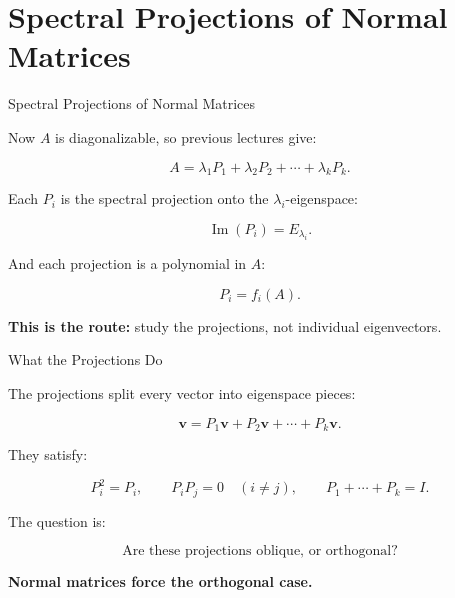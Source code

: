\documentclass[10pt]{beamer}
\theoremstyle{definition}
\newcommand{\x}[1]{\alert{\textbf{#1}}}
\begin{document}
\section{Spectral Projections of Normal Matrices}

\begin{frame}{Spectral Projections of Normal Matrices}

Now $A$ is diagonalizable, so previous lectures give:

$$
A=\lambda_1P_1+\lambda_2P_2+\cdots+\lambda_kP_k.
$$

\vfill

Each $P_i$ is the spectral projection onto the $\lambda_i$-eigenspace:

$$
\operatorname{Im}(P_i)=E_{\lambda_i}.
$$

\vfill\pause

And each projection is a polynomial in $A$:

$$
P_i=f_i(A).
$$

\vfill

\x{This is the route:} study the projections, not individual eigenvectors.

\end{frame}


\begin{frame}{What the Projections Do}

The projections split every vector into eigenspace pieces:

$$
\mathbf{v}
=P_1\mathbf{v}+P_2\mathbf{v}+\cdots+P_k\mathbf{v}.
$$

\vfill\pause

They satisfy:

$$
P_i^2=P_i,
\qquad
P_iP_j=0\quad(i\ne j),
\qquad
P_1+\cdots+P_k=I.
$$

\vfill\pause

The question is:

$$
\text{Are these projections oblique, or orthogonal?}
$$

\vfill

\x{Normal matrices force the orthogonal case.}

\end{frame}
\end{document}
